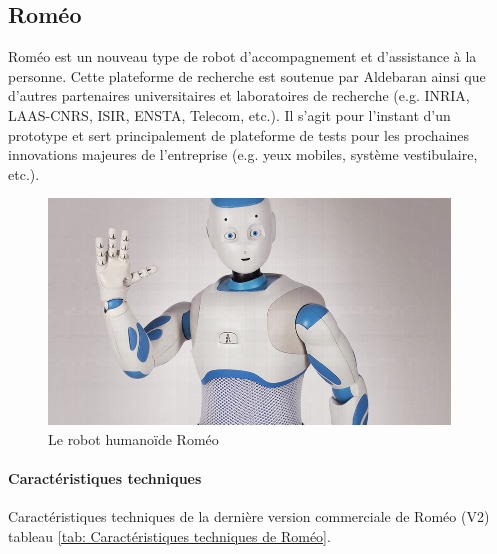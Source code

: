 \subsection{Roméo}
\label{Entreprise: Les produits: Roméo}
Roméo est un nouveau type de robot d'accompagnement et d'assistance à la personne. Cette plateforme de recherche est soutenue par Aldebaran ainsi que d'autres partenaires universitaires et laboratoires de recherche (e.g. INRIA, LAAS-CNRS, ISIR, ENSTA, Telecom, etc.). Il s'agit pour l'instant d'un prototype et sert principalement de plateforme de tests pour les prochaines innovations majeures de l'entreprise (e.g. yeux mobiles, système vestibulaire, etc.). 

\begin{figure}[H]
	\centering\includegraphics[height=6cm]{images/romeo.jpg}
	\caption{Le robot humanoïde Roméo}
	\label{fig:Robot humanoïde Roméo}
\end{figure}

\paragraph{Caractéristiques techniques}
Caractéristiques techniques de la dernière version commerciale de Roméo (V2) tableau \ref{tab: Caractéristiques techniques de Roméo}.

